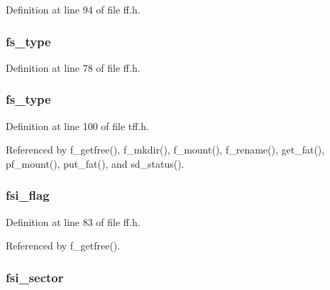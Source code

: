 Definition at line 94 of file ff.\-h.

\hypertarget{struct_f_a_t_f_s_af824d4b862f5735083d04a3add4e2ca6}{
\subsubsection[{fs\-\_\-type}]{ fs\-\_\-type}}\label{struct_f_a_t_f_s_af824d4b862f5735083d04a3add4e2ca6}


Definition at line 78 of file ff.\-h.

\hypertarget{struct_f_a_t_f_s_aee58d0bf64f06146927e78ad026b06ac}{
\subsubsection[{fs\-\_\-type}]{ fs\-\_\-type}}\label{struct_f_a_t_f_s_aee58d0bf64f06146927e78ad026b06ac}


Definition at line 100 of file tff.\-h.



Referenced by f\-\_\-getfree(), f\-\_\-mkdir(), f\-\_\-mount(), f\-\_\-rename(), get\-\_\-fat(), pf\-\_\-mount(), put\-\_\-fat(), and sd\-\_\-status().

\hypertarget{struct_f_a_t_f_s_a7f248fa8f63ffcdabc347bc9467ec9bf}{
\subsubsection[{fsi\-\_\-flag}]{ fsi\-\_\-flag}}\label{struct_f_a_t_f_s_a7f248fa8f63ffcdabc347bc9467ec9bf}


Definition at line 83 of file ff.\-h.



Referenced by f\-\_\-getfree().

\hypertarget{struct_f_a_t_f_s_acfd3664a92fb8edf69174ddb7dbb6244}{
\subsubsection[{fsi\-\_\-sector}]{ fsi\-\_\-sector}}\label{struct_f_a_t_f_s_acfd3664a92fb8edf69174ddb7dbb6244}


